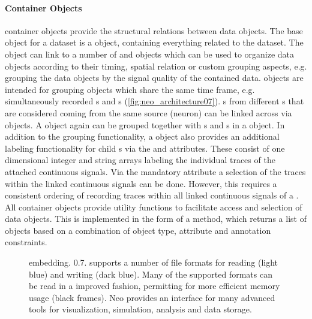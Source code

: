 \paragraph{Container Objects}
 container objects provide the structural relations between  data objects. The base object for a dataset is a  object, containing everything related to the dataset. The  object can link to a number of  and  objects which can be used to organize data objects according to their timing, spatial relation or custom grouping aspects, e.g. grouping the data objects by the signal quality of the contained data.  objects are intended for grouping objects which share the same time frame, e.g. simultaneously recorded s and s (\cref{fig:neo_architecture07}).
s from different s that are considered coming from the same source (neuron) can be linked across  via  objects.
A  object again can be grouped together with s and s in a  object. In addition to the grouping functionality, a  object also provides an additional labeling functionality for child s via the  and  attributes. These consist of one dimensional integer and string arrays labeling the individual traces of the attached continuous signals. Via the mandatory attribute  a selection of the traces within the linked continuous signals can be done. However, this requires a consistent ordering of recording traces within all linked continuous signals of a .
All container objects provide utility functions to facilitate access and selection of data objects. This is implemented in the form of a  method, which returns a list of  objects based on a combination of object type, attribute and annotation constraints.


\begin{figure}
    \centering
    
    \caption[Neo embedding]{ embedding.  0.7. supports a number of file formats for reading (light blue) and writing (dark blue). Many of the supported formats can be read in a improved fashion, permitting for more efficient memory usage (black frames).  Neo provides an interface for many advanced tools for visualization, simulation, analysis and data storage.}
    \label{fig:neo_ios}
\end{figure}


